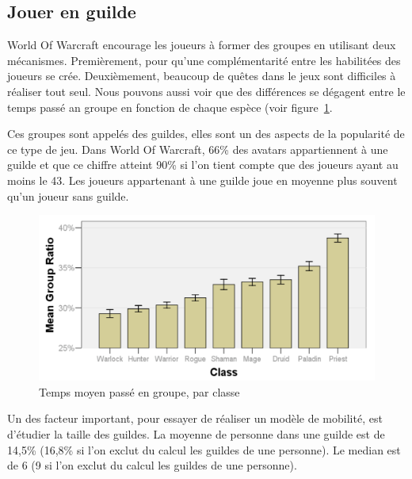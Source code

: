 \documentclass[11pt,a4paper]{article}
\begin{document}
\subsection{Jouer en guilde}
World Of Warcraft encourage les joueurs à former des groupes en utilisant deux mécanismes. Premièrement, pour qu'une complémentarité entre les habilitées des joueurs se crée. Deuxièmement, beaucoup de quêtes dans le jeux sont difficiles à réaliser tout seul. Nous pouvons aussi voir que des différences se dégagent entre le temps passé an groupe en fonction de chaque espèce (voir figure~\ref{tabltimegroup}.
\par Ces groupes sont appelés des guildes, elles sont un des aspects de la popularité de ce type de jeu. Dans World Of Warcraft, 66\% des avatars appartiennent à une guilde et que ce chiffre atteint 90\% si l'on tient compte que des joueurs ayant au moins le 43. Les joueurs appartenant à une guilde joue en moyenne plus souvent qu'un joueur sans guilde. 
	\begin{figure}[!h]
        \centering
        \includegraphics[scale=0.95]{./images/tabltimegroup.png}
        \caption{Temps moyen passé en groupe, par classe}
        \label{tabltimegroup}
        \end{figure}
\par Un des facteur important, pour essayer de réaliser un modèle de mobilité, est d'étudier la taille des guildes. La moyenne de personne dans une guilde est de 14,5\% (16,8\% si l'on exclut du calcul les guildes de une personne). Le median est de 6 (9 si l'on exclut du calcul les guildes de une personne). 
\end{document}
